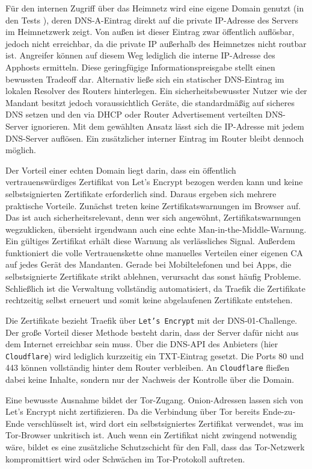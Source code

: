 Für den internen Zugriff über das Heimnetz wird eine eigene Domain genutzt (in
den Tests ), deren \ac{DNS}-A-Eintrag direkt auf die private
\ac{IP}-Adresse des Servers im Heimnetzwerk zeigt. Von außen ist dieser
Eintrag zwar öffentlich auflösbar, jedoch nicht erreichbar, da die private
\ac{IP} außerhalb des Heimnetzes nicht routbar ist. Angreifer können auf
diesem Weg lediglich die interne \ac{IP}-Adresse des Apphosts ermitteln.
Diese geringfügige Informationspreisgabe stellt einen bewussten Tradeoff dar.
Alternativ ließe sich ein statischer \ac{DNS}-Eintrag im lokalen Resolver des
Routers hinterlegen. Ein sicherheitsbewusster Nutzer wie der Mandant besitzt
jedoch voraussichtlich Geräte, die standardmäßig auf sicheres \ac{DNS} setzen
und den via \ac{DHCP} oder Router Advertisement verteilten \ac{DNS}-Server
ignorieren. Mit dem gewählten Ansatz lässt sich die \ac{IP}-Adresse mit jedem
\ac{DNS}-Server auflösen. Ein zusätzlicher interner Eintrag im Router bleibt
dennoch möglich.

Der Vorteil einer echten Domain liegt darin, dass ein öffentlich
vertrauenswürdiges Zertifikat von Let's Encrypt bezogen werden kann und keine
selbstsignierten Zertifikate erforderlich sind. Daraus ergeben sich mehrere
praktische Vorteile. Zunächst treten keine Zertifikatswarnungen im Browser
auf. Das ist auch sicherheitsrelevant, denn wer sich angewöhnt,
Zertifikatswarnungen wegzuklicken, übersieht irgendwann auch eine echte
Man-in-the-Middle-Warnung. Ein gültiges Zertifikat erhält diese Warnung als
verlässliches Signal. Außerdem funktioniert die volle Vertrauenskette ohne
manuelles Verteilen einer eigenen \ac{CA} auf jedes Gerät des Mandanten.
Gerade bei Mobiltelefonen und bei Apps, die selbstsignierte Zertifikate
strikt ablehnen, verursacht das sonst häufig Probleme. Schließlich ist die
Verwaltung vollständig automatisiert, da Traefik die Zertifikate rechtzeitig
selbst erneuert und somit keine abgelaufenen Zertifikate entstehen.

Die Zertifikate bezieht Traefik über \texttt{Let's Encrypt} mit der
\ac{DNS}-01-Challenge. Der große Vorteil dieser Methode besteht darin, dass
der Server dafür nicht aus dem Internet erreichbar sein muss. Über die
\ac{DNS}-\ac{API} des Anbieters (hier \texttt{Cloudflare}) wird lediglich kurzzeitig
ein TXT-Eintrag gesetzt. Die Ports 80 und 443 können vollständig hinter dem
Router verbleiben. An \texttt{Cloudflare} fließen dabei keine Inhalte, sondern nur der
Nachweis der Kontrolle über die Domain.

Eine bewusste Ausnahme bildet der Tor-Zugang. Onion-Adressen lassen sich von
Let's Encrypt nicht zertifizieren. Da die Verbindung über Tor bereits
Ende-zu-Ende verschlüsselt ist, wird dort ein selbstsigniertes Zertifikat
verwendet, was im Tor-Browser unkritisch ist. Auch wenn ein Zertifikat nicht
zwingend notwendig wäre, bildet es eine zusätzliche Schutzschicht für den
Fall, dass das Tor-Netzwerk kompromittiert wird oder Schwächen im
Tor-Protokoll auftreten.

